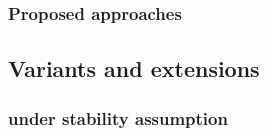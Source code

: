 \subsubsection{Proposed approaches}
\label{ssub:cc_methods}


\subsection{Variants and extensions}
\label{sub:variants_and_extensions}


\subsubsection{\pcc{} under stability assumption}
\label{ssub:cc_under_stability_assumption}


\iffalse
\subsubsection{Parallel \pcc{}}
\label{ssub:parallel_cc}

\subsection{Empirical evaluation?}
\label{sub:cc_empiracal_evaluation}
\fi
